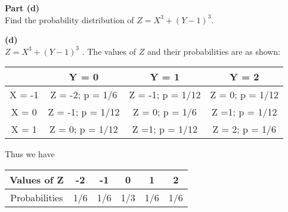 \documentclass[a4paper,12pt]{article}
\begin{document}
	\newpage
	\begin{framed}
		\noindent \textbf{Part (d)}\\ Find the probability distribution of $Z = X^3 + (Y - 1)^3$.
	\end{framed}
	\noindent \textbf{(d)}\\
	\large $Z = X^3 + (Y - 1)^3$ . The values of $Z$ and their probabilities are as shown:
	\begin{center}
		\begin{tabular}{|c||c|c|c|} \hline
			& Y = 0 & Y = 1 & Y = 2 \\ \hline \hline
			
			X = -1  &  Z = -2; p = 1/6  & Z = -1; p = 1/12 & Z = 0; p = 1/12  \\ \hline
			X = 0  &  Z = -1; p = 1/12 & Z = 0; p = 1/6   & Z =1; p = 1/12
			\\ \hline
			X = 1  & Z = 0; p = 1/12 & Z =1; p = 1/12 & Z = 2; p = 1/6 \\ \hline
		\end{tabular}
	\end{center}
	Thus we have
	
	\begin{center}
		\begin{tabular}{|c|c|c|c|c|c|} \hline
			Values of Z & -2&  -1&  0 & 1 & 2\\  \hline
			Probabilities &  1/6&  1/6&  1/3&  1/6&  1/6\\ \hline
		\end{tabular}
	\end{center}
	
	
\end{document}
